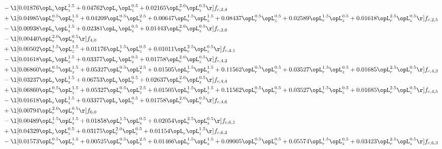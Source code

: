 \begin{alignat}{2}
& - \l[  0.01876 \opL_r \opL_z^{1.5} +  0.04762 \opL_r \opL_z^{0.5} +  0.02165 \opL_r^{2.0} \opL_z^{0.5}  \r] f_{c,2,4} \nonumber \\ 
& + \l[  0.04985 \opL_r^{0.5} \opL_z^{1.5} +  0.04209 \opL_r^{0.5} \opL_z^{2.5} +  0.00647 \opL_r^{1.5} \opL_z^{1.5} +  0.08437 \opL_r^{0.5} \opL_z^{0.5} +  0.02589 \opL_r^{1.5} \opL_z^{0.5} +  0.01618 \opL_r^{2.5} \opL_z^{0.5}  \r] f_{c,2,5} \nonumber \\ 
& - \l[  0.00938 \opL_r \opL_z^{1.5} +  0.02381 \opL_r \opL_z^{0.5} +  0.01443 \opL_r^{2.0} \opL_z^{0.5}  \r] f_{c,2,6} \nonumber \\ 
& - \l[  0.00440 \opL_r^{2.0} \opL_z^{0.5}  \r] f_{4,0} \nonumber \\ 
& + \l[  0.00502 \opL_r^{1.5} \opL_z^{1.5} +  0.01176 \opL_r^{1.5} \opL_z^{0.5} +  0.01011 \opL_r^{2.5} \opL_z^{0.5}  \r] f_{c,4,1} \nonumber \\ 
& - \l[  0.01618 \opL_r \opL_z^{1.5} +  0.03377 \opL_r \opL_z^{0.5} +  0.01758 \opL_r^{2.0} \opL_z^{0.5}  \r] f_{c,4,2} \nonumber \\ 
& + \l[  0.06860 \opL_r^{0.5} \opL_z^{1.5} +  0.05327 \opL_r^{0.5} \opL_z^{2.5} +  0.01505 \opL_r^{1.5} \opL_z^{1.5} +  0.11562 \opL_r^{0.5} \opL_z^{0.5} +  0.03527 \opL_r^{1.5} \opL_z^{0.5} +  0.01685 \opL_r^{2.5} \opL_z^{0.5}  \r] f_{c,4,3} \nonumber \\ 
& - \l[  0.03237 \opL_r \opL_z^{1.5} +  0.06753 \opL_r \opL_z^{0.5} +  0.02637 \opL_r^{2.0} \opL_z^{0.5}  \r] f_{c,4,4} \nonumber \\ 
& + \l[  0.06860 \opL_r^{0.5} \opL_z^{1.5} +  0.05327 \opL_r^{0.5} \opL_z^{2.5} +  0.01505 \opL_r^{1.5} \opL_z^{1.5} +  0.11562 \opL_r^{0.5} \opL_z^{0.5} +  0.03527 \opL_r^{1.5} \opL_z^{0.5} +  0.01685 \opL_r^{2.5} \opL_z^{0.5}  \r] f_{c,4,5} \nonumber \\ 
& - \l[  0.01618 \opL_r \opL_z^{1.5} +  0.03377 \opL_r \opL_z^{0.5} +  0.01758 \opL_r^{2.0} \opL_z^{0.5}  \r] f_{c,4,6} \nonumber \\ 
& + \l[  0.00794 \opL_r^{2.0} \opL_z^{0.5}  \r] f_{6,0} \nonumber \\ 
& - \l[  0.00489 \opL_r^{1.5} \opL_z^{1.5} +  0.01858 \opL_r^{1.5} \opL_z^{0.5} +  0.02054 \opL_r^{2.5} \opL_z^{0.5}  \r] f_{c,6,1} \nonumber \\ 
& + \l[  0.04329 \opL_r \opL_z^{0.5} +  0.03175 \opL_r^{2.0} \opL_z^{0.5} +  0.01154 \opL_r \opL_z^{1.5}  \r] f_{c,6,2} \nonumber \\ 
& - \l[  0.01573 \opL_r^{0.5} \opL_z^{1.5} +  0.00525 \opL_r^{0.5} \opL_z^{2.5} +  0.01466 \opL_r^{1.5} \opL_z^{1.5} +  0.09005 \opL_r^{0.5} \opL_z^{0.5} +  0.05574 \opL_r^{1.5} \opL_z^{0.5} +  0.03423 \opL_r^{2.5} \opL_z^{0.5}  \r] f_{c,6,3} \nonumber \\ 

\end{alignat}
